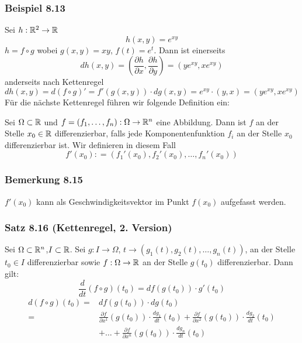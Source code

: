 \subsubsection*{Beispiel 8.13}
Sei $h:\mathbb{R}^2\to\mathbb{R}$ \[h(x,y)=e^{xy}\] $h= f\circ g$ wobei $g(x,y)=xy$, $f(t)=e^t$. Dann ist einerseits \[dh\left( {x,y} \right) = \left( {\frac{{\partial h}}{{\partial x}},\frac{{\partial h}}{{\partial y}}} \right) = \left( {y{e^{xy}},x{e^{xy}}} \right)\] anderseits nach Kettenregel
\[dh\left( {x,y} \right) = d\left( {f \circ g} \right)' = f'\left( {g\left( {x,y} \right)} \right) \cdot dg\left( {x,y} \right) = {e^{xy}} \cdot \left( {y,x} \right) = \left( {y{e^{xy}},x{e^{xy}}} \right)\]
Für die nächste Kettenregel führen wir folgende Definition ein:

\begin{definition}{8.14}
Sei $\Omega \subset\mathbb{R}$ und $f=\left( f_1,\dots,f_n\right):\Omega\to\mathbb{R}^n$ eine Abbildung. Dann ist $f$ an der Stelle $x_0\in\mathbb{R}$ differenzierbar, falls jede Komponentenfunktion $f_i$ an der Stelle $x_0$ differenzierbar ist. Wir definieren in diesem Fall \[f'\left( {{x_0}} \right): = \left( {{f_1}'\left( {{x_0}} \right),{f_2}'\left( {{x_0}} \right), \ldots ,{f_n}'\left( {{x_0}} \right)} \right)\]
\end{definition}

\subsubsection*{Bemerkung 8.15}
$f'\left( x_0\right)$ kann als Geschwindigkeitsvektor im Punkt $f\left( x_0\right)$ aufgefasst werden.

\subsubsection*{Satz 8.16 (Kettenregel, 2. Version)}
Sei $\Omega\subset\mathbb{R}^n$,$I\subset\mathbb{R}$. Sei $g:I\to\Omega$, $t\to\left( g_1(t), g_2(t),\dots, g_n(t)\right)$, an der Stelle $t_0\in I$ differenzierbar sowie $f:\Omega\to\mathbb{R}$ an der Stelle $g\left( t_0\right)$ differenzierbar. Dann gilt:
\[\frac{d}{{dt}}\left( {f \circ g} \right)\left( {{t_0}} \right) = df\left( {g\left( {{t_0}} \right)} \right) \cdot g'\left( {{t_0}} \right)\]
\begin{align*}
d\left( {f \circ g} \right)\left( {{t_0}} \right) = &df\left( {g\left( {{t_0}} \right)} \right) \cdot dg\left( {{t_0}} \right)\\
 = &\frac{{\partial f}}{{\partial {x^1}}}\left( {g\left( {{t_0}} \right)} \right) \cdot \frac{{d{g_1}}}{{dt}}\left( {{t_0}} \right) + \frac{{\partial f}}{{\partial {x^2}}}\left( {g\left( {{t_0}} \right)} \right) \cdot \frac{{d{g_2}}}{{dt}}\left( {{t_0}} \right)\\ & + \ldots  + \frac{{\partial f}}{{\partial {x^n}}}\left( {g\left( {{t_0}} \right)} \right) \cdot \frac{{d{g_n}}}{{dt}}\left( {{t_0}} \right)
\end{align*}


